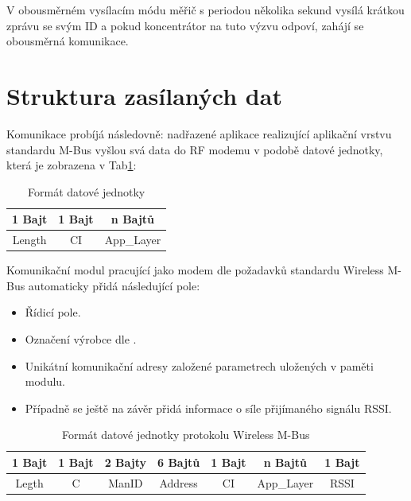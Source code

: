  V obousměrném vysílacím módu měřič s periodou několika sekund vysílá krátkou zprávu se svým ID a pokud koncentrátor na tuto výzvu odpoví, zahájí se obousměrná komunikace.




\section{Struktura zasílaných dat}
Komunikace probíjá následovně: nadřazené aplikace realizující aplikační vrstvu standardu M-Bus vyšlou svá data do RF modemu v podobě datové jednotky, která je zobrazena v Tab\ref{PaketWm1}:

\begin{table}[!h]
\centering
\begin{tabular}{ccc}
1 Bajt & 1 Bajt & n Bajtů \\ \hline
\multicolumn{1}{|c|}{Length} & \multicolumn{1}{c|}{CI} & \multicolumn{1}{c|}{App\_Layer} \\ \hline
\end{tabular}
\caption{Formát datové jednotky \cite{FormatDatoveJednotky}}
\label{PaketWm1}
\end{table}

Komunikační modul pracující jako modem dle požadavků standardu Wireless M-Bus automaticky přidá následující pole:

\begin{itemize}
	\item Řídicí pole.
\item Označení výrobce dle \cite{WmbusVendors}.
\item Unikátní komunikační adresy založené parametrech uložených v paměti modulu.
\item Případně se ještě na závěr přidá informace o síle přijímaného signálu RSSI.
\end{itemize}



\begin{table}[!h]
\centering
\begin{tabular}{ccccccc}
1 Bajt & 1 Bajt & 2 Bajty & 6 Bajtů & 1 Bajt & n Bajtů & 1 Bajt \\ \hline
\multicolumn{1}{|c|}{Legth} & \multicolumn{1}{c|}{C} & \multicolumn{1}{c|}{ManID} & \multicolumn{1}{c|}{Address} & \multicolumn{1}{c|}{CI} & \multicolumn{1}{c|}{App\_Layer} & \multicolumn{1}{c|}{RSSI} \\ \hline
\end{tabular}
\caption{Formát datové jednotky protokolu Wireless M-Bus \cite{FormatDatoveJednotky}}
\label{PaketWm2}
\end{table}

